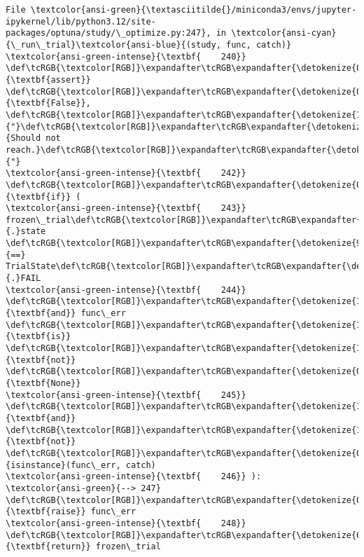 \documentclass[11pt]{article}
\begin{document}
\begin{Verbatim}[commandchars=\\\{\}, frame=single, framerule=2mm, rulecolor=\color{outerrorbackground}]
File \textcolor{ansi-green}{\textasciitilde{}/miniconda3/envs/jupyter-ipykernel/lib/python3.12/site-packages/optuna/study/\_optimize.py:247}, in \textcolor{ansi-cyan}{\_run\_trial}\textcolor{ansi-blue}{(study, func, catch)}
\textcolor{ansi-green-intense}{\textbf{    240}}         \def\tcRGB{\textcolor[RGB]}\expandafter\tcRGB\expandafter{\detokenize{0,135,0}}{\textbf{assert}} \def\tcRGB{\textcolor[RGB]}\expandafter\tcRGB\expandafter{\detokenize{0,135,0}}{\textbf{False}}, \def\tcRGB{\textcolor[RGB]}\expandafter\tcRGB\expandafter{\detokenize{175,0,0}}{"}\def\tcRGB{\textcolor[RGB]}\expandafter\tcRGB\expandafter{\detokenize{175,0,0}}{Should not reach.}\def\tcRGB{\textcolor[RGB]}\expandafter\tcRGB\expandafter{\detokenize{175,0,0}}{"}
\textcolor{ansi-green-intense}{\textbf{    242}} \def\tcRGB{\textcolor[RGB]}\expandafter\tcRGB\expandafter{\detokenize{0,135,0}}{\textbf{if}} (
\textcolor{ansi-green-intense}{\textbf{    243}}     frozen\_trial\def\tcRGB{\textcolor[RGB]}\expandafter\tcRGB\expandafter{\detokenize{98,98,98}}{.}state \def\tcRGB{\textcolor[RGB]}\expandafter\tcRGB\expandafter{\detokenize{98,98,98}}{==} TrialState\def\tcRGB{\textcolor[RGB]}\expandafter\tcRGB\expandafter{\detokenize{98,98,98}}{.}FAIL
\textcolor{ansi-green-intense}{\textbf{    244}}     \def\tcRGB{\textcolor[RGB]}\expandafter\tcRGB\expandafter{\detokenize{175,0,255}}{\textbf{and}} func\_err \def\tcRGB{\textcolor[RGB]}\expandafter\tcRGB\expandafter{\detokenize{175,0,255}}{\textbf{is}} \def\tcRGB{\textcolor[RGB]}\expandafter\tcRGB\expandafter{\detokenize{175,0,255}}{\textbf{not}} \def\tcRGB{\textcolor[RGB]}\expandafter\tcRGB\expandafter{\detokenize{0,135,0}}{\textbf{None}}
\textcolor{ansi-green-intense}{\textbf{    245}}     \def\tcRGB{\textcolor[RGB]}\expandafter\tcRGB\expandafter{\detokenize{175,0,255}}{\textbf{and}} \def\tcRGB{\textcolor[RGB]}\expandafter\tcRGB\expandafter{\detokenize{175,0,255}}{\textbf{not}} \def\tcRGB{\textcolor[RGB]}\expandafter\tcRGB\expandafter{\detokenize{0,135,0}}{isinstance}(func\_err, catch)
\textcolor{ansi-green-intense}{\textbf{    246}} ):
\textcolor{ansi-green}{--> 247}     \def\tcRGB{\textcolor[RGB]}\expandafter\tcRGB\expandafter{\detokenize{0,135,0}}{\textbf{raise}} func\_err
\textcolor{ansi-green-intense}{\textbf{    248}} \def\tcRGB{\textcolor[RGB]}\expandafter\tcRGB\expandafter{\detokenize{0,135,0}}{\textbf{return}} frozen\_trial


\end{Verbatim}
\end{document}

